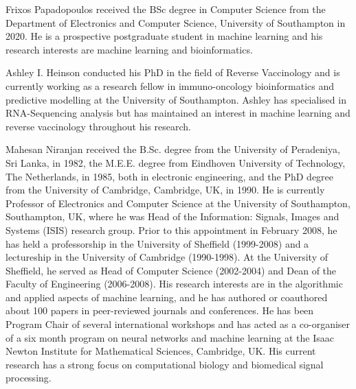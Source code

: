\documentclass[10pt,journal,compsoc,twoside]{IEEEtran}
\begin{document}
% 

\begin{IEEEbiography}{Frixos Papadopoulos}
received the BSc degree in Computer Science from the Department of Electronics and Computer Science, University of Southampton in 2020. He is a prospective postgraduate student in machine learning and his research interests are machine learning and bioinformatics.
\end{IEEEbiography}

\begin{IEEEbiography}{Ashley I. Heinson}
conducted his PhD in the field of Reverse Vaccinology and is currently working as a research fellow in immuno-oncology bioinformatics and predictive modelling at the University of Southampton. Ashley has specialised in RNA-Sequencing analysis but has maintained an interest in machine learning and reverse vaccinology throughout his research.
\end{IEEEbiography}

\begin{IEEEbiography}{Mahesan Niranjan}
received the B.Sc. degree from the University of Peradeniya, Sri Lanka, in 1982, the M.E.E. degree from Eindhoven University of Technology, The Netherlands, in 1985, both in electronic engineering, and the PhD degree from the University of Cambridge, Cambridge, UK, in 1990. He is currently Professor of Electronics and Computer Science at the University of Southampton, Southampton, UK, where he was Head of the Information: Signals, Images and Systems (ISIS) research group. Prior to this appointment in February 2008, he has held a professorship in the University of Sheffield (1999-2008) and a lectureship in the University of Cambridge (1990-1998). At the University of Sheffield, he served as Head of Computer Science (2002-2004) and Dean of the Faculty of Engineering (2006-2008). His research interests are in the algorithmic and applied aspects of machine learning, and he has authored or coauthored about 100 papers in peer-reviewed journals and conferences. He has been Program Chair of several international workshops and has acted as a co-organiser of a six month program on neural networks and machine learning at the Isaac Newton Institute for Mathematical Sciences, Cambridge, UK. His current research has a strong focus on computational biology and biomedical signal processing.
\end{IEEEbiography}
\end{document}
